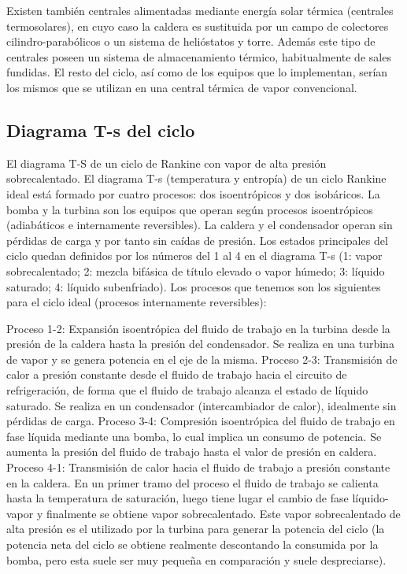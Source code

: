 \documentclass[../main]{subfiles}
\begin{document}
Existen también centrales alimentadas mediante energía solar térmica (centrales termosolares), en cuyo caso la caldera es sustituida por un campo de colectores cilindro-parabólicos o un sistema de helióstatos y torre. Además este tipo de centrales poseen un sistema de almacenamiento térmico, habitualmente de sales fundidas. El resto del ciclo, así como de los equipos que lo implementan, serían los mismos que se utilizan en una central térmica de vapor convencional.

\subsection{Diagrama T-s del ciclo}

El diagrama T-S de un ciclo de Rankine con vapor de alta presión sobrecalentado.
El diagrama T-s (temperatura y entropía) de un ciclo Rankine ideal está formado por cuatro procesos: dos isoentrópicos y dos isobáricos. La bomba y la turbina son los equipos que operan según procesos isoentrópicos (adiabáticos e internamente reversibles). La caldera y el condensador operan sin pérdidas de carga y por tanto sin caídas de presión. Los estados principales del ciclo quedan definidos por los números del 1 al 4 en el diagrama T-s (1: vapor sobrecalentado; 2: mezcla bifásica de título elevado o vapor húmedo; 3: líquido saturado; 4: líquido subenfriado). Los procesos que tenemos son los siguientes para el ciclo ideal (procesos internamente reversibles):

Proceso 1-2: Expansión isoentrópica del fluido de trabajo en la turbina desde la presión de la caldera hasta la presión del condensador. Se realiza en una turbina de vapor y se genera potencia en el eje de la misma.
Proceso 2-3: Transmisión de calor a presión constante desde el fluido de trabajo hacia el circuito de refrigeración, de forma que el fluido de trabajo alcanza el estado de líquido saturado. Se realiza en un condensador (intercambiador de calor), idealmente sin pérdidas de carga.
Proceso 3-4: Compresión isoentrópica del fluido de trabajo en fase líquida mediante una bomba, lo cual implica un consumo de potencia. Se aumenta la presión del fluido de trabajo hasta el valor de presión en caldera.
Proceso 4-1: Transmisión de calor hacia el fluido de trabajo a presión constante en la caldera. En un primer tramo del proceso el fluido de trabajo se calienta hasta la temperatura de saturación, luego tiene lugar el cambio de fase líquido-vapor y finalmente se obtiene vapor sobrecalentado. Este vapor sobrecalentado de alta presión es el utilizado por la turbina para generar la potencia del ciclo (la potencia neta del ciclo se obtiene realmente descontando la consumida por la bomba, pero esta suele ser muy pequeña en comparación y suele despreciarse).
\end{document}
